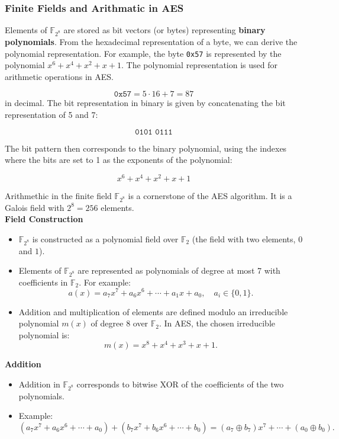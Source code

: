 \subsubsection{Finite Fields and Arithmatic in AES}
Elements of $\mathbb{F}_{2^8}$ are stored as bit vectors (or bytes) representing \textbf{binary polynomials}. From the hexadecimal representation of a byte, we can derive the polynomial representation. For example, the byte \texttt{0x57} is represented by the polynomial $x^6 + x^4 + x^2 + x + 1$. The polynomial representation is used for arithmetic operations in AES.

\[ \texttt{0x57} = 5 \cdot 16 + 7 = 87 \] in decimal. The bit representation in binary is given by concatenating the bit representation of 5 and 7:

\[\texttt{0101 0111}\]

The bit pattern then corresponds to the binary polynomial, using the indexes where the bits are set to 1 as the exponents of the polynomial:

\[ x^6 + x^4 + x^2 + x + 1\] 

Arithmethic in the finite field $\mathbb{F}_{2^8}$ is a cornerstone of the AES algorithm. It is a Galois field with $2^8 = 256$ elements. \\

\textbf{Field Construction}
\begin{itemize}
    \item \(\mathbb{F}_{2^8}\) is constructed as a polynomial field over \(\mathbb{F}_2\) (the field with two elements, \(0\) and \(1\)).
    \item Elements of \(\mathbb{F}_{2^8}\) are represented as polynomials of degree at most 7 with coefficients in \(\mathbb{F}_2\). For example:
    \[
    a(x) = a_7x^7 + a_6x^6 + \cdots + a_1x + a_0, \quad a_i \in \{0, 1\}.
    \]
    \item Addition and multiplication of elements are defined modulo an irreducible polynomial \(m(x)\) of degree 8 over \(\mathbb{F}_2\). In AES, the chosen irreducible polynomial is:
    \[
    m(x) = x^8 + x^4 + x^3 + x + 1.
    \]
\end{itemize}

\textbf{Addition}
\begin{itemize}
    \item Addition in \(\mathbb{F}_{2^8}\) corresponds to bitwise XOR of the coefficients of the two polynomials.
    \item Example:
    \[
    (a_7x^7 + a_6x^6 + \cdots + a_0) + (b_7x^7 + b_6x^6 + \cdots + b_0)
    = (a_7 \oplus b_7)x^7 + \cdots + (a_0 \oplus b_0).
    \]
\end{itemize}

